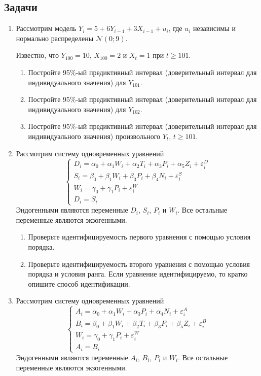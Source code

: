 \documentclass[12pt]{article}
\def \e{\varepsilon}
\def \cN{\mathcal{N}}
\theoremstyle{definition}
\begin{document}
\subsection*{Задачи}
\begin{enumerate}
\item Рассмотрим модель $Y_i = 5 + 6Y_{i-1} + 3X_{i-1} + u_i$, 
где $u_i$ независимы и нормально распределены $\cN(0; 9)$.

Известно, что $Y_{100} = 10$, $X_{100} = 2$ и $X_{t} = 1$ при $t\geq 101$.
\begin{enumerate}
  \item Постройте 95\%-ый предиктивный интервал (доверительный интервал для индивидуального значения) для $Y_{101}$.
  \item Постройте 95\%-ый предиктивный интервал (доверительный интервал для индивидуального значения) для $Y_{102}$.
  \item Постройте 95\%-ый предиктивный интервал (доверительный интервал для индивидуального значения) произвольного $Y_{t}$, $t\geq 101$.
\end{enumerate}

\item Рассмотрим систему одновременных уравнений
\[
\begin{cases}
D_i = \alpha_0 + \alpha_1 W_i + \alpha_2 T_i + \alpha_3 P_i + \alpha_5 Z_i + \e_i^D \\
S_i = \beta_0 + \beta_1 W_i + \beta_3 P_i + \beta_4 N_i + \e_i^S \\
W_i = \gamma_0 + \gamma_1 P_i + \e_i^W \\
D_i = S_i 
\end{cases}
\]
Эндогенными являются переменные $D_i$, $S_i$, $P_i$ и $W_i$. Все остальные переменные являются экзогенными.

\begin{enumerate}
  \item Проверьте идентифицируемость первого уравнения с помощью условия порядка.
  \item Проверьте идентифицируемость второго уравнения с помощью условия порядка и условия ранга.
  Если уравнение идентифицируемо, то кратко опишите способ идентификации.
\end{enumerate}


\item Рассмотрим систему одновременных уравнений
\[
\begin{cases}
A_i = \alpha_0 + \alpha_1 W_i + \alpha_3 P_i + \alpha_4 N_i + \e_i^A \\
B_i = \beta_0 + \beta_1 W_i + \beta_2 T_i + \beta_3 P_i + \beta_5 Z_i + \e_i^B \\
W_i = \gamma_0 + \gamma_1 P_i + \e_i^W \\
A_i = B_i 
\end{cases}
\]
Эндогенными являются переменные $A_i$, $B_i$, $P_i$ и $W_i$. Все остальные переменные являются экзогенными.


\end{enumerate}
\end{document}
